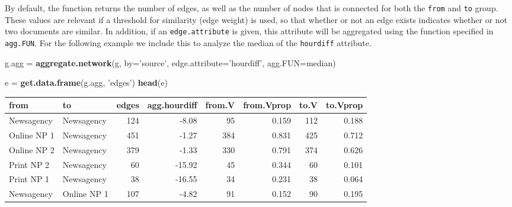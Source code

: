 \documentclass[]{article}
\newenvironment{Shaded}{\begin{snugshade}}{\end{snugshade}}
\newcommand{\KeywordTok}[1]{\textcolor[rgb]{0.13,0.29,0.53}{\textbf{{#1}}}}
\newcommand{\DataTypeTok}[1]{\textcolor[rgb]{0.13,0.29,0.53}{{#1}}}
\newcommand{\StringTok}[1]{\textcolor[rgb]{0.31,0.60,0.02}{{#1}}}
\newcommand{\NormalTok}[1]{{#1}}
\begin{document}
By default, the function returns the number of edges, as well as the
number of nodes that is connected for both the \texttt{from} and
\texttt{to} group. These values are relevant if a threshold for
similarity (edge weight) is used, so that whether or not an edge exists
indicates whether or not two documents are similar. In addition, if an
\texttt{edge.attribute} is given, this attribute will be aggregated
using the function specified in \texttt{agg.FUN}. For the following
example we include this to analyze the median of the \texttt{hourdiff}
attribute.

\begin{Shaded}
\begin{Highlighting}[]
\NormalTok{g.agg =}\StringTok{ }\KeywordTok{aggregate.network}\NormalTok{(g, }\DataTypeTok{by=}\StringTok{'source'}\NormalTok{, }\DataTypeTok{edge.attribute=}\StringTok{'hourdiff'}\NormalTok{, }\DataTypeTok{agg.FUN=}\NormalTok{median)}

\NormalTok{e =}\StringTok{ }\KeywordTok{get.data.frame}\NormalTok{(g.agg, }\StringTok{'edges'}\NormalTok{)}
\KeywordTok{head}\NormalTok{(e)}
\end{Highlighting}
\end{Shaded}

\begin{longtable}[c]{@{}llrrrrrr@{}}
\toprule
from & to & edges & agg.hourdiff & from.V & from.Vprop & to.V &
to.Vprop\tabularnewline
\midrule
\endhead
Newsagency & Newsagency & 124 & -8.08 & 95 & 0.159 & 112 &
0.188\tabularnewline
Online NP 1 & Newsagency & 451 & -1.27 & 384 & 0.831 & 425 &
0.712\tabularnewline
Online NP 2 & Newsagency & 379 & -1.33 & 330 & 0.791 & 374 &
0.626\tabularnewline
Print NP 2 & Newsagency & 60 & -15.92 & 45 & 0.344 & 60 &
0.101\tabularnewline
Print NP 1 & Newsagency & 38 & -16.55 & 34 & 0.231 & 38 &
0.064\tabularnewline
Newsagency & Online NP 1 & 107 & -4.82 & 91 & 0.152 & 90 &
0.195\tabularnewline
\bottomrule
\end{longtable}
\end{document}
